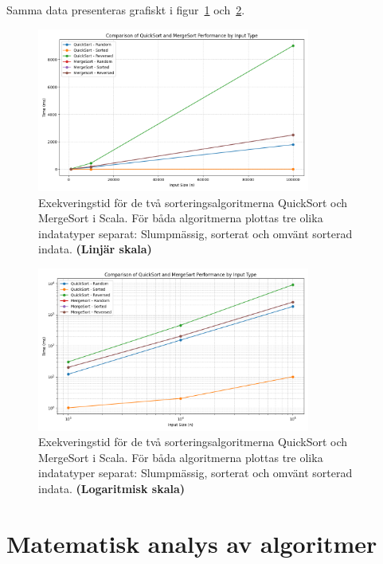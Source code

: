 \documentclass[a4paper,12pt]{article}   %
\begin{document}
Samma data presenteras grafiskt i figur~\ref{fig:plot_sort_linear} och~\ref{fig:plot_sort_log}.


\begin{figure}
    \centering
    \includegraphics[width=0.8\textwidth]{plot_sort_linear.png}
    \caption{Exekveringstid för de två sorteringsalgoritmerna QuickSort och MergeSort i Scala. För båda algoritmerna plottas tre olika indatatyper separat: Slumpmässig, sorterat och omvänt sorterad indata. \textbf{(Linjär skala)}}
    \label{fig:plot_sort_linear}
\end{figure}
\begin{figure}
    \centering
    \includegraphics[width=0.8\textwidth]{plot_sort_log.png}
    \caption{Exekveringstid för de två sorteringsalgoritmerna QuickSort och MergeSort i Scala. För båda algoritmerna plottas tre olika indatatyper separat: Slumpmässig, sorterat och omvänt sorterad indata. \textbf{(Logaritmisk skala)}}
    \label{fig:plot_sort_log}
\end{figure}

\newpage

\section{Matematisk analys av algoritmer}
\end{document}
